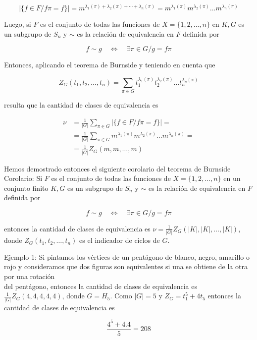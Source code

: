 \documentclass[10pt]{article}
\begin{document}
$$
|\{f \in F / f \pi=f\}|=m^{\lambda_{1}(\pi)+\lambda_{2}(\pi)+\cdots+\lambda_{n}(\pi)}=m^{\lambda_{1}(\pi)} m^{\lambda_{2}(\pi)} \ldots m^{\lambda_{n}(\pi)}
$$

Luego, si $F$ es el conjunto de todas las funciones de $X=\{1,2, \ldots, n\}$ en $K, G$ es un subgrupo de $S_{n}$ y $\sim$ es la relación de equivalencia en $F$ definida por

$$
f \sim g \quad \Longleftrightarrow \quad \exists \pi \in G / g=f \pi
$$

Entonces, aplicando el teorema de Burnside y teniendo en cuenta que

$$
Z_{G}\left(t_{1}, t_{2}, \ldots, t_{n}\right)=\sum_{\pi \in G} t_{1}^{\lambda_{1}(\pi)} t_{2}^{\lambda_{2}(\pi)} \ldots t_{n}^{\lambda_{n}(\pi)}
$$

resulta que la cantidad de clases de equivalencia es

$$
\begin{aligned}
\nu & =\frac{1}{|G|} \sum_{\pi \in G}|\{f \in F / f \pi=f\}|= \\
& =\frac{1}{|G|} \sum_{\pi \in G} m^{\lambda_{1}(\pi)} m^{\lambda_{2}(\pi)} \ldots m^{\lambda_{n}(\pi)}= \\
& =\frac{1}{|G|} Z_{G}(m, m, \ldots, m)
\end{aligned}
$$

Hemos demostrado entonces el siguiente corolario del teorema de Burnside\\
Corolario: Si $F$ es el conjunto de todas las funciones de $X=\{1,2, \ldots, n\}$ en un conjunto finito $K, G$ es un subgrupo de $S_{n}$ y $\sim$ es la relación de equivalencia en $F$ definida por

$$
f \sim g \quad \Longleftrightarrow \quad \exists \pi \in G / g=f \pi
$$

entonces la cantidad de clases de equivalencia es $\nu=\frac{1}{|G|} Z_{G}(|K|,|K|, \ldots,|K|)$, donde $Z_{G}\left(t_{1}, t_{2}, \ldots, t_{n}\right)$ es el indicador de ciclos de $G$.

Ejemplo 1: Si pintamos los vértices de un pentágono de blanco, negro, amarillo o rojo y consideramos que dos figuras son equivalentes si una se obtiene de la otra por una rotación\\
del pentágono, entonces la cantidad de clases de equivalencia es $\frac{1}{|G|} Z_{G}(4,4,4,4,4)$, donde $G=H_{5}$. Como $|G|=5$ y $Z_{G}=t_{1}^{5}+4 t_{5}$ entonces la cantidad de clases de equivalencia es

$$
\frac{4^{5}+4.4}{5}=208
$$
\end{document}
